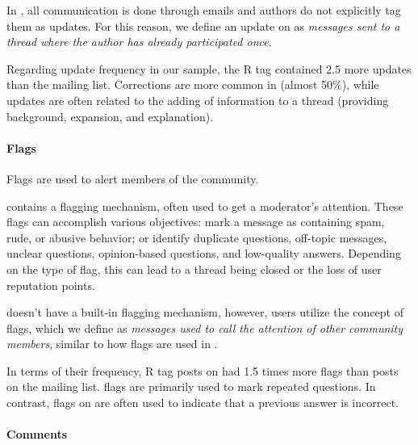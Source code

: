 In \RH, all communication is done through emails and authors do not explicitly tag them as updates. For this reason, we define an update on \RH as \emph{messages sent to a thread where the author has already participated once}.

Regarding update frequency in our sample, the \SO R tag contained 2.5 more updates than the \RH mailing list. Corrections are more common in \SO (almost 50\%), while \RH updates are often related to the adding of information to a thread (providing background, expansion, and explanation).

\paragraph*{Flags}
Flags are used to alert members of the community.

\SO contains a flagging mechanism, often used to get a moderator's attention. These flags can accomplish various objectives: mark a message as containing spam, rude, or abusive behavior; or identify
duplicate questions, off-topic messages, unclear questions, opinion-based questions, and low-quality
answers. Depending on the type of flag, this can lead to a thread being closed or the loss of user reputation points.  

\RH doesn't have a built-in flagging mechanism, however, \RH users utilize the concept of flags, which we define as \emph{messages used to call the attention of other community members}, similar to how flags are used in \SO.



In terms of their frequency, R tag posts on \SO had 1.5 times more flags than posts on the \RH mailing list. \SO flags are primarily used to mark repeated questions. In contrast, flags on \RH are often used to indicate that a previous answer is incorrect.

\paragraph*{Comments}

